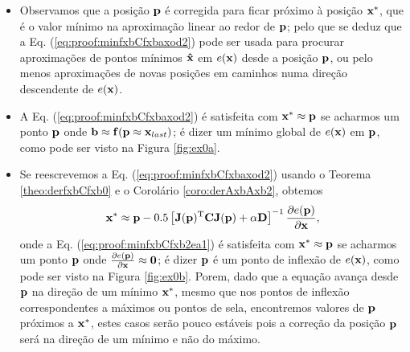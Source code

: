 \begin{myproofT}
\begin{itemize}
\item Observamos que a posição $\VECTOR{p}$ é corregida para ficar próximo à posição $\VECTOR{x}^*$, 
que é o valor mínimo na aproximação linear ao redor de $\VECTOR{p}$;
pelo que se deduz que a Eq. (\ref{eq:proof:minfxbCfxbaxod2})
pode ser usada para procurar aproximações de pontos mínimos $\VECTOR{\hat{x}}$ em $e(\VECTOR{x})$ desde a posição $\VECTOR{p}$,
ou pelo menos aproximações de novas posições em caminhos numa direção descendente de $e(\VECTOR{x})$.

\item A Eq. (\ref{eq:proof:minfxbCfxbaxod2}) é satisfeita 
com $\VECTOR{x}^* \approx \VECTOR{p}$ se acharmos um  
ponto $\VECTOR{p}$ onde  $\VECTOR{b} \approx \VECTOR{f}(\VECTOR{p}\approx \VECTOR{x}_{last})$; 
é dizer um mínimo global de $e(\VECTOR{x})$ em $\VECTOR{p}$, como pode ser visto na Figura \ref{fig:ex0a}. 

\item Se reescrevemos a Eq. (\ref{eq:proof:minfxbCfxbaxod2}) usando o Teorema \ref{theo:derfxbCfxb0}
e o Corolário \ref{coro:derAxbAxb2},
obtemos
\begin{equation}\label{eq:proof:minfxbCfxbaxod2ea1}
\VECTOR{x}^* \approx \VECTOR{p} -
0.5 \left[ \MATRIX{J}(\VECTOR{p})^{\transpose}\MATRIX{C} \MATRIX{J}(\VECTOR{p})+\alpha \MATRIX{D} \right]^{-1}
\frac{\partial e(\VECTOR{p})}{\partial \VECTOR{x} },
\end{equation}
onde a Eq. (\ref{eq:proof:minfxbCfxb2ea1}) é satisfeita 
com $\VECTOR{x}^* \approx \VECTOR{p}$
se acharmos um  ponto $\VECTOR{p}$ onde  
$\frac{\partial e(\VECTOR{p})}{\partial \VECTOR{x} }\approx \VECTOR{0}$; 
é dizer $\VECTOR{p}$ é um ponto de inflexão de $e(\VECTOR{x})$, como pode ser visto na Figura \ref{fig:ex0b}.
Porem, dado que a equação avança desde $\VECTOR{p}$ na direção de um mínimo $\VECTOR{x}^*$, 
mesmo que nos pontos de inflexão correspondentes a máximos ou pontos de sela,
encontremos valores de $\VECTOR{p}$ próximos a $\VECTOR{x}^*$,
 estes casos serão pouco estáveis pois
a correção da posição $\VECTOR{p}$ será na direção de um mínimo e não do máximo.


\end{itemize}
\end{myproofT}
